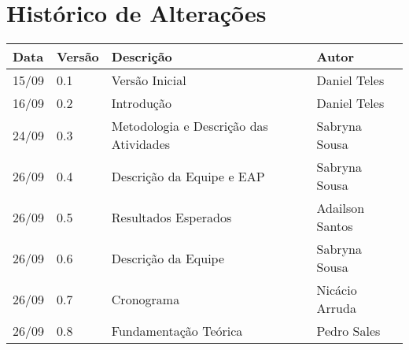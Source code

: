 \chapter*{Histórico de Alterações}

\begin{table}[!htbp]
\centering
\label{my-label}
\begin{tabular}{|l|l|l|l|}
\hline
\textbf{Data} & \textbf{Versão} & \textbf{Descrição} & \textbf{Autor} \\ \hline
15/09         & 0.1             & Versão Inicial     & Daniel Teles   \\ \hline
16/09         & 0.2             & Introdução         & Daniel Teles   \\ \hline
24/09         & 0.3             & Metodologia e Descrição das Atividades       & Sabryna Sousa  \\ \hline
26/09         & 0.4             & Descrição da Equipe e EAP       & Sabryna Sousa  \\ \hline
26/09         & 0.5             & Resultados Esperados       & Adailson Santos  \\ \hline
26/09         & 0.6             & Descrição da Equipe       & Sabryna Sousa  \\ \hline
26/09         & 0.7             & Cronograma       & Nicácio Arruda  \\ \hline
26/09         & 0.8             & Fundamentação Teórica     & Pedro Sales\\ \hline

\end{tabular}
\end{table}

\cleardoublepage
